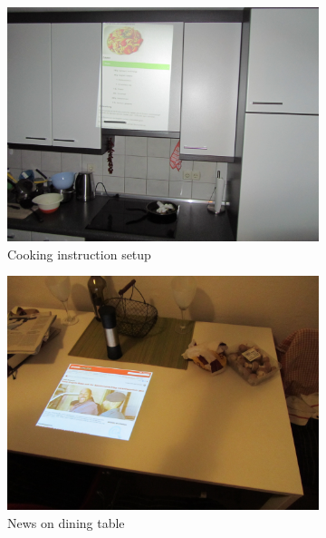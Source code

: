 \begin{figure}
        \centering
               \begin{subfigure}[b]{0.31\textwidth}
                \includegraphics[width=\textwidth]{images/interview/kitchen2.jpg}
                \caption{Cooking instruction setup}
                \label{img:cooking2}
        \end{subfigure}
\hfill
        \begin{subfigure}[b]{0.31\textwidth}
                \includegraphics[width=\textwidth]{images/interview/eat.jpg}
                \caption{News on dining table}
                \label{fig:newsTable}
        \end{subfigure}
        \hfill
        \begin{subfigure}[b]{0.31\textwidth}

\end{subfigure}
\end{figure}
